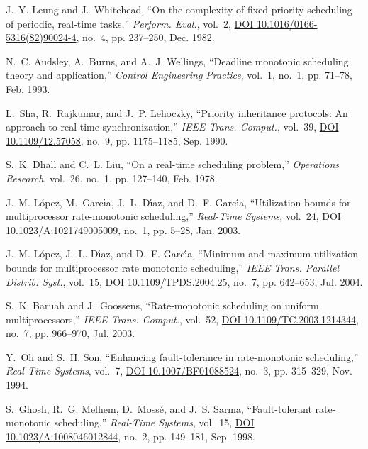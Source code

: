 \documentclass[12pt,onecolumn]{IEEEtranTIE}
\begin{document}
\begin{thebibliography}{10}
J.~Y. Leung and J.~Whitehead, ``On the complexity of fixed-priority scheduling
  of periodic, real-time tasks,'' \emph{Perform. Eval.}, vol.~2,
  \href{http://dx.doi.org/10.1016/0166-5316(82)90024-4}{DOI
  10.1016/0166-5316(82)90024-4}, no.~4, pp. 237--250, Dec. 1982.

N.~C. Audsley, A.~Burns, and A.~J. Wellings, ``Deadline monotonic scheduling
  theory and application,'' \emph{Control Engineering Practice}, vol.~1, no.~1,
  pp. 71--78, Feb. 1993.

L.~Sha, R.~Rajkumar, and J.~P. Lehoczky, ``Priority inheritance protocols: An
  approach to real-time synchronization,'' \emph{{IEEE} Trans. Comput.},
  vol.~39, \href{http://dx.doi.org/10.1109/12.57058}{DOI 10.1109/12.57058},
  no.~9, pp. 1175--1185, Sep. 1990.

S.~K. Dhall and C.~L. Liu, ``On a real-time scheduling problem,''
  \emph{Operations Research}, vol.~26, no.~1, pp. 127--140, Feb. 1978.

J.~M. L{\'{o}}pez, M.~Garc{\'{\i}}a, J.~L. D{\'{\i}}az, and D.~F.
  Garc{\'{\i}}a, ``Utilization bounds for multiprocessor rate-monotonic
  scheduling,'' \emph{Real-Time Systems}, vol.~24,
  \href{http://dx.doi.org/10.1023/A:1021749005009}{DOI
  10.1023/A:1021749005009}, no.~1, pp. 5--28, Jan. 2003.

J.~M. L{\'{o}}pez, J.~L. D{\'{\i}}az, and D.~F. Garc{\'{\i}}a, ``Minimum and
  maximum utilization bounds for multiprocessor rate monotonic scheduling,''
  \emph{{IEEE} Trans. Parallel Distrib. Syst.}, vol.~15,
  \href{http://dx.doi.org/10.1109/TPDS.2004.25}{DOI 10.1109/TPDS.2004.25},
  no.~7, pp. 642--653, Jul. 2004.

S.~K. Baruah and J.~Goossens, ``Rate-monotonic scheduling on uniform
  multiprocessors,'' \emph{{IEEE} Trans. Comput.}, vol.~52,
  \href{http://dx.doi.org/10.1109/TC.2003.1214344}{DOI
  10.1109/TC.2003.1214344}, no.~7, pp. 966--970, Jul. 2003.

Y.~Oh and S.~H. Son, ``Enhancing fault-tolerance in rate-monotonic
  scheduling,'' \emph{Real-Time Systems}, vol.~7,
  \href{http://dx.doi.org/10.1007/BF01088524}{DOI 10.1007/BF01088524}, no.~3,
  pp. 315--329, Nov. 1994.

S.~Ghosh, R.~G. Melhem, D.~Moss{\'{e}}, and J.~S. Sarma, ``Fault-tolerant
  rate-monotonic scheduling,'' \emph{Real-Time Systems}, vol.~15,
  \href{http://dx.doi.org/10.1023/A:1008046012844}{DOI
  10.1023/A:1008046012844}, no.~2, pp. 149--181, Sep. 1998.


\end{thebibliography}
\end{document}
